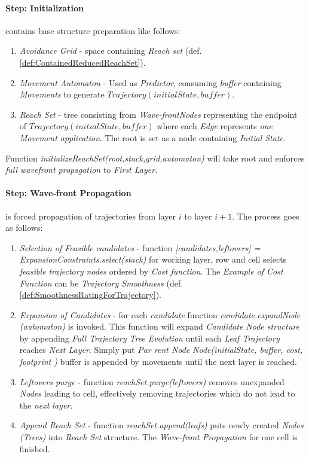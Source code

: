 \paragraph{Step: Initialization} contains base structure preparation like follows:
\begin{enumerate}
    \item \emph{Avoidance Grid} - space containing \emph{Reach set} (def. \ref{def:ContainedReducedReachSet}).
    
    \item \emph{Movement Automaton} - Used as \emph{Predictor}, consuming \emph{buffer} containing \emph{Movements} to generate $Trajectory(initialState,buffer)$.
    
    \item \emph{Reach Set} -  tree consisting from \emph{Wave-frontNodes} representing the endpoint of $Trajectory(initialState,buffer)$ where each \emph{Edge} represents \emph{one Movement application}. The root is set as a node containing \emph{Initial State}.
\end{enumerate}

\noindent Function \emph{initializeReachSet(root,stack,grid,automaton)} will take root and enforces \emph{full wavefront propagation} to \emph{First Layer}.


\paragraph{Step: Wave-front Propagation} is forced propagation of trajectories from layer $i$ to layer $i+1$. The process goes as follows:
\begin{enumerate}
    \item \emph{Selection of Feasible candidates} - function \emph{[candidates,leftovers] = ExpansionConstraints.select(stack)} for working layer, row and cell selects \emph{feasible trajectory nodes} ordered by \emph{Cost function}. The \emph{Example of Cost Function} can be \emph{Trajectory Smoothness} (def. \ref{def:SmoothnessRatingForTrajectory}).
    
    \item \emph{Expansion of Candidates} - for each \emph{candidate} function \emph{candidate.expandNode (automaton)} is invoked. This function will expand \emph{Candidate Node structure} by appending \emph{Full Trajectory Tree Evolution} until each \emph{Leaf Trajectory} reaches \emph{Next Layer}. Simply put \emph{Par rent Node} \emph{Node(initialState, buffer, cost, footprint )} buffer is appended by movements until the next layer is reached.
    
    \item \emph{Leftovers purge} - function \emph{reachSet.purge(leftovers)} removes unexpanded \emph{Nodes} leading to cell, effectively  removing trajectories which do not  lead to the \emph{next layer}.
    
    \item \emph{Append Reach Set} - function \emph{reachSet.append(leafs)} puts newly created \emph{Nodes (Trees)} into \emph{Reach Set} structure. The \emph{Wave-front Propagation} for one cell is finished.
\end{enumerate}

